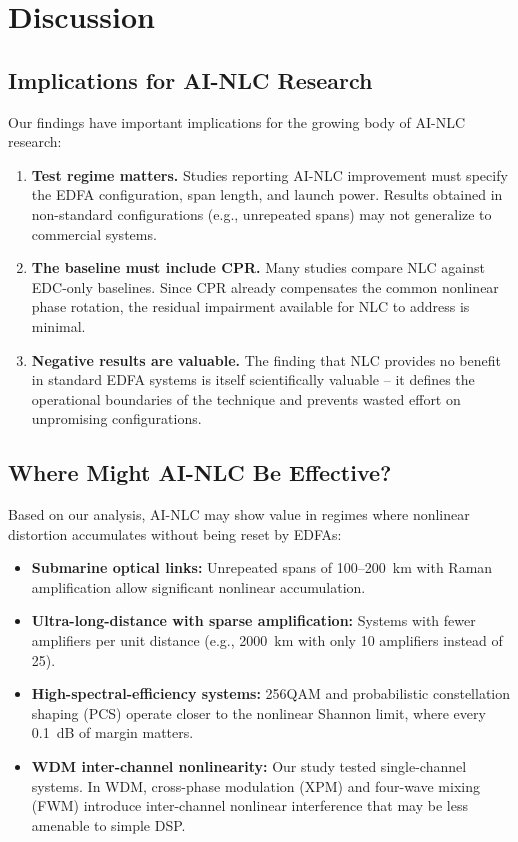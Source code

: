 \documentclass[conference]{IEEEtran}
\begin{document}
\section{Discussion}

\subsection{Implications for AI-NLC Research}

Our findings have important implications for the growing body of AI-NLC research:

\begin{enumerate}
    \item \textbf{Test regime matters.} Studies reporting AI-NLC improvement must specify the EDFA configuration, span length, and launch power. Results obtained in non-standard configurations (e.g., unrepeated spans) may not generalize to commercial systems.
    
    \item \textbf{The baseline must include CPR.} Many studies compare NLC against EDC-only baselines. Since CPR already compensates the common nonlinear phase rotation, the residual impairment available for NLC to address is minimal.
    
    \item \textbf{Negative results are valuable.} The finding that NLC provides no benefit in standard EDFA systems is itself scientifically valuable -- it defines the operational boundaries of the technique and prevents wasted effort on unpromising configurations.
\end{enumerate}

\subsection{Where Might AI-NLC Be Effective?}

Based on our analysis, AI-NLC may show value in regimes where nonlinear distortion accumulates without being reset by EDFAs:

\begin{itemize}
    \item \textbf{Submarine optical links:} Unrepeated spans of 100--200~km with Raman amplification allow significant nonlinear accumulation.
    
    \item \textbf{Ultra-long-distance with sparse amplification:} Systems with fewer amplifiers per unit distance (e.g., 2000~km with only 10 amplifiers instead of 25).
    
    \item \textbf{High-spectral-efficiency systems:} 256QAM and probabilistic constellation shaping (PCS) operate closer to the nonlinear Shannon limit, where every 0.1~dB of margin matters.
    
    \item \textbf{WDM inter-channel nonlinearity:} Our study tested single-channel systems. In WDM, cross-phase modulation (XPM) and four-wave mixing (FWM) introduce inter-channel nonlinear interference that may be less amenable to simple DSP.
\end{itemize}
\end{document}
